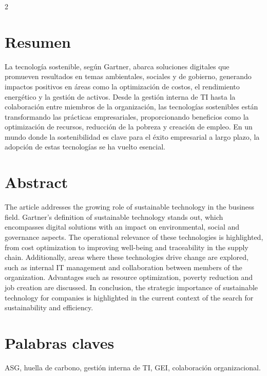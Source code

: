 \documentclass[12pt,spanish,Letterpaper,openany]{book}
\begin{document}
\begin {multicols}{2}

\hypertarget{resumen-9}{%
\section{Resumen}\label{resumen-9}}

La tecnología sostenible, según Gartner, abarca soluciones digitales que promueven resultados en temas ambientales, sociales y de gobierno, generando impactos positivos en áreas como la optimización de costos, el rendimiento energético y la gestión de activos. Desde la gestión interna de TI hasta la colaboración entre miembros de la organización, las tecnologías sostenibles están transformando las prácticas empresariales, proporcionando beneficios como la optimización de recursos, reducción de la pobreza y creación de empleo. En un mundo donde la sostenibilidad es clave para el éxito empresarial a largo plazo, la adopción de estas tecnologías se ha vuelto esencial.

\hypertarget{abstract-9}{%
\section{Abstract}\label{abstract-9}}

The article addresses the growing role of sustainable technology in the business field. Gartner's definition of sustainable technology stands out, which encompasses digital solutions with an impact on environmental, social and governance aspects. The operational relevance of these technologies is highlighted, from cost optimization to improving well-being and traceability in the supply chain. Additionally, areas where these technologies drive change are explored, such as internal IT management and collaboration between members of the organization. Advantages such as resource optimization, poverty reduction and job creation are discussed. In conclusion, the strategic importance of sustainable technology for companies is highlighted in the current context of the search for sustainability and efficiency.

\hypertarget{palabras-claves-9}{%
\section{Palabras claves}\label{palabras-claves-9}}

ASG, huella de carbono, gestión interna de TI, GEI, colaboración organizacional.


\end{multicols}
\end{document}
